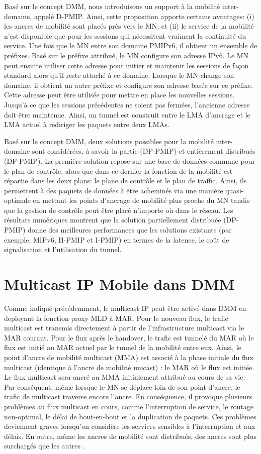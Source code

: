 Basé sur le concept DMM, nous introduisons un support à la mobilité inter-domaine, appelé D-PMIP. Ainsi, cette proposition apporte certains avantages: (i) les ancres de mobilité sont placés près vers le MN; et  (ii) le service de la mobilité n'est disponible que pour les sessions qui nécessitent vraiment la continuité du service. Une fois que le MN entre son domaine PMIPv6, il obtient un ensemble de préfixes. Basé sur le préfixe attribué, le MN configure son adresse IPv6. Le MN peut ensuite utiliser cette adresse pour initier et maintenir les sessions de façon standard alors qu'il reste attaché à ce domaine. Lorsque le MN change son domaine, il obtient un autre préfixe et configure son adresse basée sur ce préfixe. Cette adresse peut être utilisée pour mettre en place les nouvelles sessions. Jusqu'à ce que les sessions précédentes ne soient pas fermées, l'ancienne adresse doit être maintenue. Ainsi, un tunnel est construit entre le LMA d'ancrage et le LMA actuel à rediriger les paquets entre deux LMAs.

Basé sur le concept DMM, deux solutions possibles pour la mobilité inter-domaine sont considérées, à savoir la partie (DP-PMIP) et entièrement distribués (DF-PMIP). La première solution repose sur une base de données commune pour le plan de contrôle, alors que dans ce dernier la fonction de la mobilité est répartie dans les deux plans: le plane de contrôle et le plan de traffic. Ainsi, ils permettent à des paquets de données à être acheminés via une manière quasi-optimale en mettant les points d'ancrage de mobilité plus proche du MN tandis que la gestion de contrôle peut être placé n'importe où dans le réseau. Les résultats numériques montrent que la solution partiellement distribuée (DP-PMIP) donne des meilleures performances que les solutions existants (par exemple, MIPv6, H-PMIP et I-PMIP) en termes de la latence, le coût de signalisation et l'utilisation du tunnel.
\section{Multicast IP Mobile dans DMM}

Comme indiqué précédemment, le multicast IP peut être activé dans DMM en deployant la fonction proxy MLD à MAR. Pour le nouveau flux, le trafic multicast est transmis directement à partir de l'infrastructure multicast via le MAR courant. Pour le flux après le handover, le trafic est tunnelé du MAR où le flux est initié au MAR actuel par le tunnel de la mobilité entre eux. Ainsi, le point d'ancre de mobilité multicast (MMA) est associé à la phase initiale du flux multicast (identique à l'ancre de mobilité unicast) : le MAR où le flux est initiée. Le flux multicast sera ancré au MMA initialement attribué au cours de sa vie. Par conséquent, même lorsque le MN se déplace loin de son point d'ancre, le trafic de multicast traverse encore l'ancre. En conséquence, il provoque plusieurs problèmes au flux multicast en cours, comme l'interruption de service, le routage non-optimal, le délai de bout-en-bout et la duplication de paquets. Ces problèmes deviennent graves lorsqu'on considère les services sensibles à l'interruption et aux délais. En outre, même les ancres de mobilité sont distribués, des ancres sont plus surchargés que les autres \cite {anchor_selection}.

